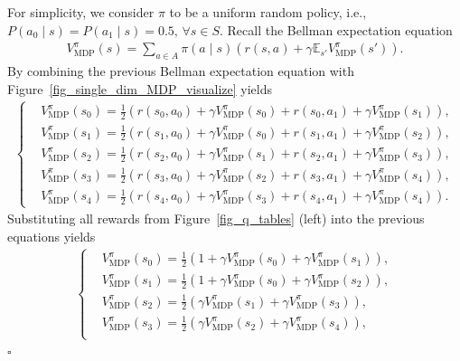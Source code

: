 \documentclass[10pt]{article}
\newenvironment{myproof}{{\noindent\it Proof. }}{\hfill $\square$ \par}
\def\mbE{{\ensuremath{\mathbb E}}}
\begin{document}
\begin{myproof}
    For simplicity, we consider $\pi$ to be a uniform random policy, i.e., $P(a_0 \mid s) = P(a_1 \mid s) = 0.5, \, \forall s \in S.$
    Recall the Bellman expectation equation
    \begin{align}
        V_\text{MDP}^{\pi}(s) = \sum_{a \in A} \pi(a \mid s) \left( r(s, a) + \gamma \mbE_{s'} V_\text{MDP}^{\pi}(s') \right).
    \end{align}
    By combining the previous Bellman expectation equation with Figure~\ref{fig_single_dim_MDP_visualize} yields
    \begin{align}
    \begin{cases}
    &\!\!\!\!\!\! V_\text{MDP}^{\pi}(s_0) = \frac{1}{2} \left(r(s_0, a_0) + \gamma V_\text{MDP}^{\pi}(s_0) + r(s_0, a_1) + \gamma V_\text{MDP}^{\pi}(s_1) \right),  \\
    &\!\!\!\!\!\! V_\text{MDP}^{\pi}(s_1) = \frac{1}{2} \left(r(s_1, a_0) + \gamma V_\text{MDP}^{\pi}(s_0) + r(s_1, a_1) + \gamma V_\text{MDP}^{\pi}(s_2) \right),  \\
    &\!\!\!\!\!\! V_\text{MDP}^{\pi}(s_2) = \frac{1}{2} \left(r(s_2, a_0) + \gamma V_\text{MDP}^{\pi}(s_1) + r(s_2, a_1) + \gamma V_\text{MDP}^{\pi}(s_3) \right),  \\
    &\!\!\!\!\!\! V_\text{MDP}^{\pi}(s_3) = \frac{1}{2} \left(r(s_3, a_0) + \gamma V_\text{MDP}^{\pi}(s_2) + r(s_3, a_1) + \gamma V_\text{MDP}^{\pi}(s_4) \right),  \\
    &\!\!\!\!\!\! V_\text{MDP}^{\pi}(s_4) = \frac{1}{2} \left(r(s_4, a_0) + \gamma V_\text{MDP}^{\pi}(s_3) + r(s_4, a_1) + \gamma V_\text{MDP}^{\pi}(s_4) \right).
    \end{cases}
    \end{align}
    Substituting all rewards from Figure~\ref{fig_q_tables} (left) into the previous equations yields
    \begin{align}\label{eqn_lemma1}
    \begin{cases}
    &\!\!\!\!\!\! V_\text{MDP}^{\pi}(s_0) = \frac{1}{2} \left(1 + \gamma V_\text{MDP}^{\pi}(s_0) + \gamma V_\text{MDP}^{\pi}(s_1) \right),  \\
    &\!\!\!\!\!\! V_\text{MDP}^{\pi}(s_1) = \frac{1}{2} \left(1 + \gamma V_\text{MDP}^{\pi}(s_0) +  \gamma V_\text{MDP}^{\pi}(s_2) \right),  \\
    &\!\!\!\!\!\! V_\text{MDP}^{\pi}(s_2) = \frac{1}{2} \left(\gamma V_\text{MDP}^{\pi}(s_1) + \gamma V_\text{MDP}^{\pi}(s_3) \right),  \\
    &\!\!\!\!\!\! V_\text{MDP}^{\pi}(s_3) = \frac{1}{2} \left( \gamma V_\text{MDP}^{\pi}(s_2) + \gamma V_\text{MDP}^{\pi}(s_4) \right),  \\

\end{cases}
\end{align}
\end{myproof}
\end{document}
